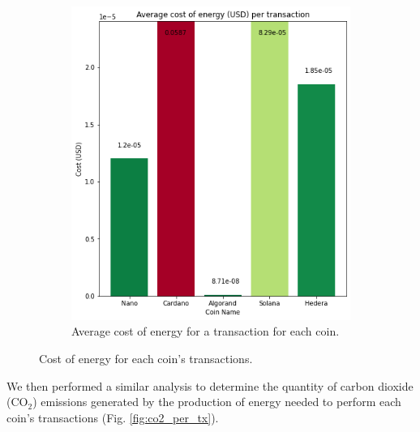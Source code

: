 \documentclass{article}
\begin{document}
\begin{figure}[h!]
\begin{subfigure}[b]{0.45\linewidth}
    \includegraphics[width=\linewidth]{images/average_cost_per_transaction.png}
    \caption{Average cost of energy for a transaction for each coin.}
  \end{subfigure}
  \caption{Cost of energy for each coin's transactions.}
  \label{fig:cost_per_tx}
\end{figure}

We then performed a similar analysis to determine the quantity of carbon dioxide ($\text{CO}_2$) emissions generated by the production of energy needed to perform each coin's transactions (Fig. \ref{fig:co2_per_tx}).
\end{document}
